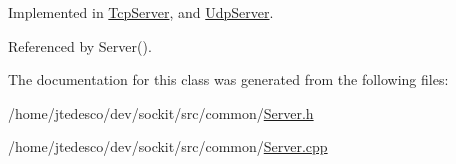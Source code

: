 Implemented in \hyperlink{classTcpServer_ad16f797335dd9c54eaec93c35d158569}{TcpServer}, and \hyperlink{classUdpServer_a55e557d344720286fdeb430ae3cb3842}{UdpServer}.



Referenced by Server().



The documentation for this class was generated from the following files:\begin{DoxyCompactItemize}
\item 
/home/jtedesco/dev/sockit/src/common/\hyperlink{Server_8h}{Server.h}\item 
/home/jtedesco/dev/sockit/src/common/\hyperlink{Server_8cpp}{Server.cpp}\end{DoxyCompactItemize}
